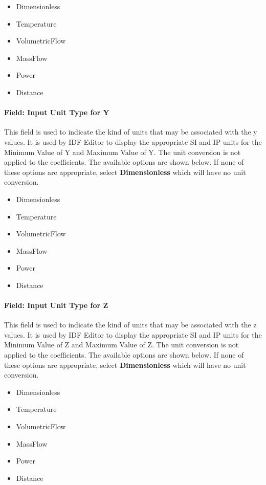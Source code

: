 \begin{itemize}
\item
  Dimensionless
\item
  Temperature
\item
  VolumetricFlow
\item
  MassFlow
\item
  Power
\item
  Distance
\end{itemize}

\paragraph{Field: Input Unit Type for Y}\label{field-input-unit-type-for-y-6}

This field is used to indicate the kind of units that may be associated with the y values. It is used by IDF Editor to display the appropriate SI and IP units for the Minimum Value of Y and Maximum Value of Y. The unit conversion is not applied to the coefficients. The available options are shown below. If none of these options are appropriate, select \textbf{Dimensionless} which will have no unit conversion.

\begin{itemize}
\item
  Dimensionless
\item
  Temperature
\item
  VolumetricFlow
\item
  MassFlow
\item
  Power
\item
  Distance
\end{itemize}

\paragraph{Field: Input Unit Type for Z}\label{field-input-unit-type-for-z-2}

This field is used to indicate the kind of units that may be associated with the z values. It is used by IDF Editor to display the appropriate SI and IP units for the Minimum Value of Z and Maximum Value of Z. The unit conversion is not applied to the coefficients. The available options are shown below. If none of these options are appropriate, select \textbf{Dimensionless} which will have no unit conversion.

\begin{itemize}
\item
  Dimensionless
\item
  Temperature
\item
  VolumetricFlow
\item
  MassFlow
\item
  Power
\item
  Distance
\end{itemize}

